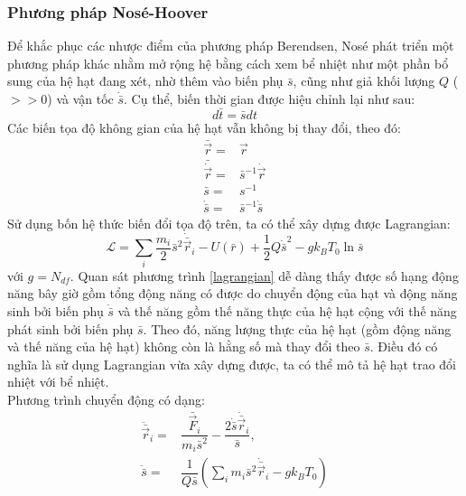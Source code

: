 \documentclass[12pt,a4paper,reqno, oneside]{book}
\begin{document}
		\subsubsection{Phương pháp Nosé-Hoover}
		
			Để khắc phục các nhược điểm của phương pháp Berendsen, Nosé phát triển một phương pháp khác nhằm mở rộng hệ bằng cách xem bể nhiệt như một phần bổ sung của hệ hạt đang xét, nhờ thêm vào biến phụ $\bar{s}$, cũng như giả khối lượng $Q$ ($>>0$) và vận tốc $\dot{\bar{s}}$. Cụ thể, biến thời gian được hiệu chỉnh lại như sau:
			\begin{equation}
			d\bar{t}=\bar{s} dt
			\end{equation}
			Các biến tọa độ không gian của hệ hạt vẫn không bị thay đổi, theo đó:
			\begin{align}
			\bar{\vec{r}} = & \vec{r}\\
			\bar{\dot{\vec{r}}} = & \bar{s}^{-1}\dot{\vec{r}}\\
			\bar{s} = & s^{-1}\\
			\dot{\bar{s}} = & \bar{s}^{-1}\dot{\bar{s}}
			\end{align}
			Sử dụng bốn hệ thức biến đổi tọa độ trên, ta có thể xây dựng được Lagrangian:
			\begin{equation}
			\mathcal{L}=\sum_{i} \dfrac{m_{i}}{2}\bar{s}^{2}\dot{\bar{\vec{r}}}_{i} - U\left(\bar{r}\right) + \dfrac{1}{2}Q\dot{\bar{s}}^{2} - gk_{B}T_{0}\ln \bar{s}
			\label{lagrangian}
			\end{equation}
			với $g=N_{df}$.
			Quan sát phương trình \eqref{lagrangian} dễ dàng thấy được số hạng động năng bây giờ gồm tổng động năng có được do chuyển động của hạt và động năng sinh bởi biến phụ $\dot{\bar{s}}$ và thế năng gồm thế năng thực của hệ hạt cộng với thế năng phát sinh bởi biến phụ $\bar{s}$. Theo đó, năng lượng thực của hệ hạt (gồm động năng và thế năng của hệ hạt) không còn là hằng số mà thay đổi theo $\bar{s}$. Điều đó có nghĩa là sử dụng Lagrangian vừa xây dựng được, ta có thể mô tả hệ hạt trao đổi nhiệt với bể nhiệt.\\
			Phương trình chuyển động có dạng:
			\begin{align}
			\ddot{\bar{\vec{r}}}_{i} = & \dfrac{\bar{\vec{F}}_{i}}{m_{i}\bar{s}^{2}} - \dfrac{2\dot{\bar{s}}\dot{\bar{\vec{r}}}_{i}}{\bar{s}},\\
			\ddot{\bar{s}} = & \dfrac{1}{Q\bar{s}}\left( \sum_{i}m_{i}\bar{s}^{2}\dot{\bar{\vec{r}}}_{i} - gk_{B}T_{0} \right)
			\label{s_bar}
			\end{align}
\end{document}
